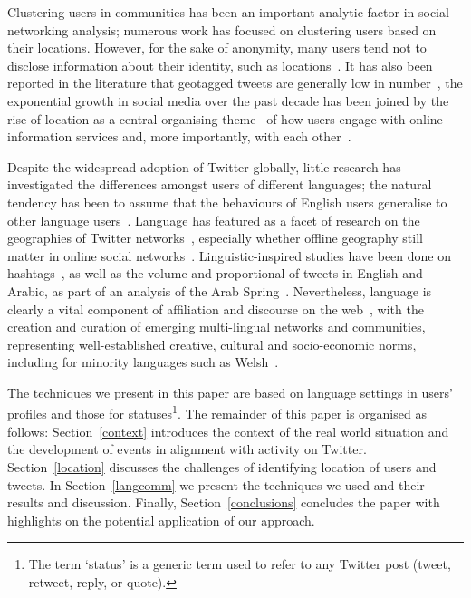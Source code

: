 \documentclass[conference]{IEEEtran}
\begin{document}
Clustering users in communities has been an important analytic factor
in social networking analysis; numerous work has focused on clustering
users based on their locations. However, for the sake of anonymity,
many users tend not to disclose information about their identity, such
as locations~\cite{kang-et-al:2013}. It has also been reported in the
literature that geotagged tweets are generally low in
number~\cite{morstatter-et-al:2013,tan-et-al:2013,kumar-et-al:2014},
the exponential growth in social media over the past decade has been
joined by the rise of location as a central organising
theme~\cite{liang-et-al:2013} of how users engage with online
information services and, more importantly, with each
other~\cite{cheng-et-al:2010,caverlee-et-al:2013}.

Despite the widespread adoption of Twitter globally, little research
has investigated the differences amongst users of different languages;
the natural tendency has been to assume that the behaviours of English
users generalise to other language
users~\cite{hong-et-al:2011}. Language has featured as a facet of
research on the geographies of Twitter
networks~\cite{takhteyev-et-al:2012}, especially whether offline
geography still matter in online social
networks~\cite{kulshrestha-et-al:2012}. Linguistic-inspired studies
have been done on hashtags~\cite{cunha-et-al:2011}, as well as the
volume and proportional of tweets in English and Arabic, as part of an
analysis of the Arab Spring~\cite{bruns-et-al:2013}. Nevertheless,
language is clearly a vital component of affiliation and discourse on
the web~\cite{zappavigna+martin:2012}, with the creation and curation
of emerging multi-lingual networks and communities, representing
well-established creative, cultural and socio-economic norms,
including for minority languages such as Welsh~\cite{gj+uj:2013}.

The techniques we present in this paper are based on language settings
in users' profiles and those for statuses\footnote{The term `status'
is a generic term used to refer to any Twitter post (tweet, retweet,
reply, or quote).}. The remainder of this paper is organised as
follows: Section~\ref{context} introduces the context of the real
world situation and the development of events in alignment with
activity on Twitter. Section~\ref{location} discusses the challenges
of identifying location of users and tweets. In Section~\ref{langcomm}
we present the techniques we used and their results and
discussion. Finally, Section~\ref{conclusions} concludes the paper
with highlights on the potential application of our approach.
\end{document}
